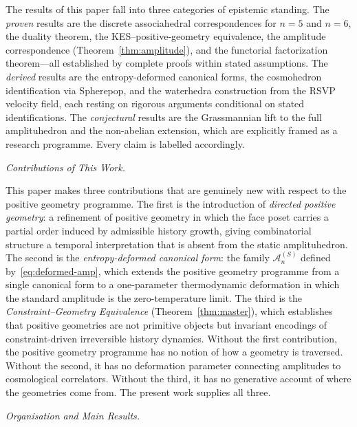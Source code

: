 \documentclass[11pt]{article}
\theoremstyle{plain}
\theoremstyle{definition}
\theoremstyle{remark}
\newcommand{\Sf}{S}
\begin{document}
The results of this paper fall into three categories of epistemic standing. The \emph{proven} results are the discrete associahedral correspondences for $n=5$ and $n=6$, the duality theorem, the KES--positive-geometry equivalence, the amplitude correspondence (Theorem~\ref{thm:amplitude}), and the functorial factorization theorem---all established by complete proofs within stated assumptions. The \emph{derived} results are the entropy-deformed canonical forms, the cosmohedron identification via Spherepop, and the waterhedra construction from the RSVP velocity field, each resting on rigorous arguments conditional on stated identifications. The \emph{conjectural} results are the Grassmannian lift to the full amplituhedron and the non-abelian extension, which are explicitly framed as a research programme. Every claim is labelled accordingly.

\medskip\noindent\textit{Contributions of This Work.}

This paper makes three contributions that are genuinely new with respect to the positive geometry programme. The first is the introduction of \emph{directed positive geometry}: a refinement of positive geometry in which the face poset carries a partial order induced by admissible history growth, giving combinatorial structure a temporal interpretation that is absent from the static amplituhedron. The second is the \emph{entropy-deformed canonical form}: the family $\mathcal{A}_n^{(\Sf)}$ defined by~\eqref{eq:deformed-amp}, which extends the positive geometry programme from a single canonical form to a one-parameter thermodynamic deformation in which the standard amplitude is the zero-temperature limit. The third is the \emph{Constraint--Geometry Equivalence} (Theorem~\ref{thm:master}), which establishes that positive geometries are not primitive objects but invariant encodings of constraint-driven irreversible history dynamics. Without the first contribution, the positive geometry programme has no notion of how a geometry is traversed. Without the second, it has no deformation parameter connecting amplitudes to cosmological correlators. Without the third, it has no generative account of where the geometries come from. The present work supplies all three.

\medskip\noindent\textit{Organisation and Main Results.}
\end{document}
